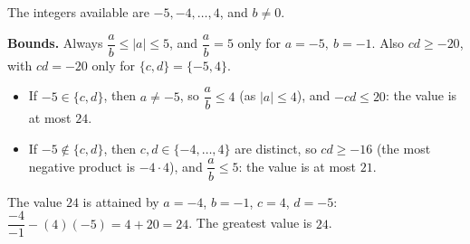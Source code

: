 The integers available are $-5,-4,\dots,4$, and $b\ne0$.

\textbf{Bounds.} Always $\dfrac {a}{b}\le|a|\le5$, and $\dfrac {a}{b}=5$ only for $a=-5,\ b=-1$. Also $cd\ge-20$, with $cd=-20$ only for $\{c,d\}=\{-5,4\}$.
\begin{itemize}
\item If $-5\in\{c,d\}$, then $a\ne-5$, so $\dfrac {a}{b}\le4$ (as $|a|\le4$), and $-cd\le20$: the value is at most $24$.
\item If $-5\notin\{c,d\}$, then $c,d\in\{-4,\dots,4\}$ are distinct, so $cd\ge-16$ (the most negative product is $-4\cdot4$), and $\dfrac {a}{b}\le5$: the value is at most $21$.
\end{itemize}
The value $24$ is attained by $a=-4$, $b=-1$, $c=4$, $d=-5$: $\dfrac{-4}{-1}-(4)(-5)=4+20=24$. The greatest value is $\boxed{24}$.
